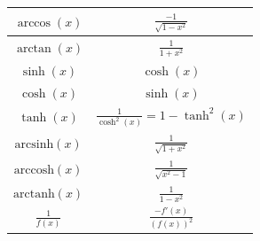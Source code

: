 \documentclass[a4paper,8pt]{extarticle}
\begin{document}
\begin{center}
\begin{tabular}{|c|c|}
	        $ \arccos(x) $ & $ \frac{-1}{\sqrt{1 - x^2}} $ \\
          \hline
	        $ \arctan(x) $ & $ \frac{1}{1 + x^2} $ \\
          \hline
	        $ \sinh(x) $ & $ \cosh(x) $ \\
          \hline
	        $ \cosh(x) $ & $ \sinh(x) $ \\
          \hline
          $ \tanh(x) $ & $ \frac{1}{\cosh^2(x)} = 1 - \tanh^2(x) $ \\
          \hline
          $ \text{arcsinh}(x) $ & $ \frac{1}{\sqrt{1 + x^2}} $ \\
          \hline
          $ \text{arccosh}(x) $ & $ \frac{1}{\sqrt{x^2 - 1}} $ \\
          \hline
          $ \text{arctanh}(x) $ & $ \frac{1}{1 - x^2} $ \\
          \hline
          $ \frac{1}{f(x)} $ & $ \frac{-f'(x)}{(f(x))^2} $ \\
          \hline
        \end{tabular}
\end{center}
\end{document}
